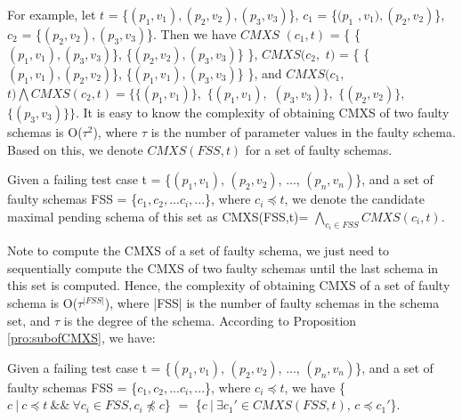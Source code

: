 For example, let $t$ = \{$(p_{1},v_{1}), (p_{2}, v_{2}), (p_{3}, v_{3})$\}, $c_{1}$ = \{$(p_{1}$ $, v_{1}), (p_{2}, v_{2})$\}, $c_{2}$ = \{$(p_{2}, v_{2}), (p_{3}, v_{3})$\}. Then we have $CMXS$ $(c_{1}, t)$ = \{ \{$(p_{1}, v_{1}), (p_{3}, v_{3})$\}, \{$(p_{2}, v_{2}), (p_{3}, v_{3})$\} \}, $CMXS(c_{2},$ $ t)$ = \{ \{$(p_{1}, v_{1}), (p_{2}, v_{2})$\}, \{$(p_{1}, v_{1}), (p_{3}, v_{3})$\} \}, and  $CMXS(c_{1},$ $ t) \bigwedge CMXS(c_{2}, t) = \{ \{(p_{1}, v_{1})\},$ $ \{(p_{1}, v_{1}), $ $(p_{3}, v_{3})\}, $ $ \{(p_{2}, v_{2})\}, $ $\{(p_{3}, v_{3})\} \} $. It is easy to know the complexity of obtaining CMXS of two faulty schemas is O($\tau^{2}$), where $\tau$ is the number of parameter values in the faulty schema. Based on this, we denote $CMXS(FSS,t)$ for a set of faulty schemas.

\begin{definition}
Given a failing test case t = \{$(p_{1}, v_{1})$, $(p_{2}, v_{2})$, ..., $(p_{n}, v_{n})$\}, and a set of faulty schemas FSS = \{$c_{1} , c_{2}, ... c_{i}, ...$\}, where $ c_{i} \preceq t$,  we denote the candidate maximal pending schema of this set as CMXS(FSS,t)= $\bigwedge_{c_{i}\in FSS} CMXS(c_{i}, t)$.
\end{definition}

Note to compute the CMXS of a set of faulty schema, we just need to sequentially compute the CMXS of two faulty schemas until the last schema in this set is computed. Hence, the complexity of obtaining CMXS of a set of faulty schema is O($\tau^{|FSS|}$), where |FSS| is the number of faulty schemas in the schema set, and $\tau$ is the degree of the schema. According to Proposition \ref{pro:subofCMXS}, we have:

\begin{proposition}\label{pro:subofCMXSfor2}
Given a failing test case t = \{$(p_{1}, v_{1})$, $(p_{2}, v_{2})$, ..., $(p_{n}, v_{n})$\}, and a set of faulty schemas FSS = \{$c_{1} , c_{2}, ... c_{i}, ...$\}, where $ c_{i} \preceq t$,  we have \{$c\ |\ c \preceq t\ \&\&\ \forall c_{i} \in FSS, c_{i} \npreceq c $\} $=$  \{$ c\ |\ \exists c_{1}' \in CMXS(FSS, t)$, $c \preceq c_{1}'$\}.
\end{proposition}

